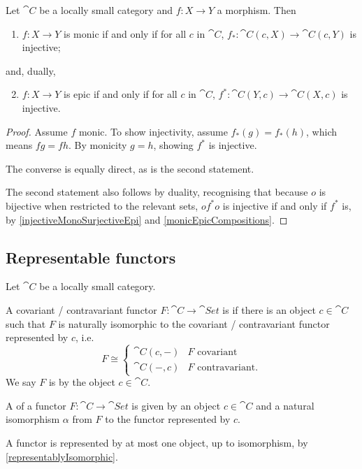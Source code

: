\begin{proposition} \label{monicEpicInPrePostComposition}
Let $\cat{C}$ be a locally small category and $f: X\to Y$ a morphism. Then
\begin{enumerate}
\item $f: X\to Y$ is monic \textup{if and only if} for all $c$ in $\cat{C}$, $f_*: \cat{C}(c,X) \to \cat{C}(c,Y)$ is injective;
\end{enumerate}
and, dually,
\begin{enumerate}
\setcounter{enumi}{1}
\item $f:X\to Y$ is epic \textup{if and only if} for all $c$ in $\cat{C}$, $f^*: \cat{C}(Y,c) \to \cat{C}(X,c)$ is injective.
\end{enumerate}
\end{proposition}
\begin{proof}
Assume $f$ monic. To show injectivity, assume $f_*(g) = f_*(h)$, which means $fg = fh$. By monicity $g = h$, showing $f^*$ is injective.

The converse is equally direct, as is the second statement.

The second statement also follows by duality, recognising that because $o$ is bijective when restricted to the relevant sets, $of^*o$ is injective if and only if $f^*$ is, by \ref{injectiveMonoSurjectiveEpi} and \ref{monicEpicCompositions}.
\end{proof}

\subsection{Representable functors}
\begin{definition}
Let $\cat{C}$ be a locally small category.

A covariant / contravariant functor $F: \cat{C} \to \cat{Set}$ is  if there is an object $c\in\cat{C}$ such that $F$ is naturally isomorphic to the covariant / contravariant functor represented by $c$, i.e.\
\[ F \cong \begin{cases}
\cat{C}(c,-) & \text{$F$ covariant} \\
\cat{C}(-,c) & \text{$F$ contravariant.}
\end{cases} \]
We say $F$ is  by the object $c\in\cat{C}$.

A  of a functor $F: \cat{C} \to \cat{Set}$ is given by an object $c\in\cat{C}$ and a natural isomorphism $\alpha$ from $F$ to the functor represented by $c$.
\end{definition}
A functor is represented by at most one object, up to isomorphism, by \ref{representablyIsomorphic}.

